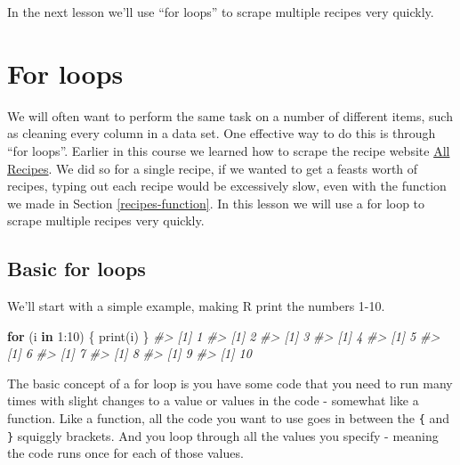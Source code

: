 \documentclass[
  12pt,
]{book}
\newenvironment{Shaded}{\begin{snugshade}}{\end{snugshade}}
\newcommand{\CommentTok}[1]{\textcolor[rgb]{0.37,0.37,0.37}{\textit{#1}}}
\newcommand{\ControlFlowTok}[1]{\textcolor[rgb]{0.27,0.27,0.27}{\textbf{#1}}}
\newcommand{\DecValTok}[1]{\textcolor[rgb]{0.06,0.06,0.06}{#1}}
\newcommand{\FunctionTok}[1]{\textcolor[rgb]{0,0,0}{#1}}
\newcommand{\NormalTok}[1]{#1}
\newcommand{\SpecialCharTok}[1]{\textcolor[rgb]{0,0,0}{#1}}
\begin{document}
In the next lesson we'll use ``for loops'' to scrape multiple recipes very quickly.

\hypertarget{for-loops}{%
\chapter{For loops}\label{for-loops}}

We will often want to perform the same task on a number of different items, such as cleaning every column in a data set. One effective way to do this is through ``for loops''. Earlier in this course we learned how to scrape the recipe website \href{https://www.allrecipes.com/}{All Recipes}. We did so for a single recipe, if we wanted to get a feasts worth of recipes, typing out each recipe would be excessively slow, even with the function we made in Section \ref{recipes-function}. In this lesson we will use a for loop to scrape multiple recipes very quickly.

\hypertarget{basic-for-loops}{%
\section{Basic for loops}\label{basic-for-loops}}

We'll start with a simple example, making R print the numbers 1-10.

\begin{Shaded}
\begin{Highlighting}[]
\ControlFlowTok{for}\NormalTok{ (i }\ControlFlowTok{in} \DecValTok{1}\SpecialCharTok{:}\DecValTok{10}\NormalTok{) \{}
   \FunctionTok{print}\NormalTok{(i)}
\NormalTok{\}}
\CommentTok{\#\textgreater{} [1] 1}
\CommentTok{\#\textgreater{} [1] 2}
\CommentTok{\#\textgreater{} [1] 3}
\CommentTok{\#\textgreater{} [1] 4}
\CommentTok{\#\textgreater{} [1] 5}
\CommentTok{\#\textgreater{} [1] 6}
\CommentTok{\#\textgreater{} [1] 7}
\CommentTok{\#\textgreater{} [1] 8}
\CommentTok{\#\textgreater{} [1] 9}
\CommentTok{\#\textgreater{} [1] 10}
\end{Highlighting}
\end{Shaded}

The basic concept of a for loop is you have some code that you need to run many times with slight changes to a value or values in the code - somewhat like a function. Like a function, all the code you want to use goes in between the \texttt{\{} and \texttt{\}} squiggly brackets. And you loop through all the values you specify - meaning the code runs once for each of those values.
\end{document}
